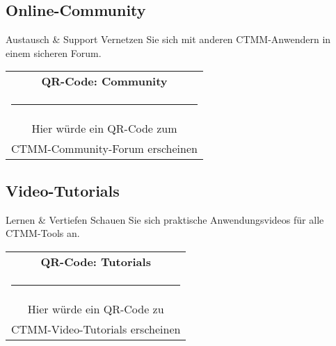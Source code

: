 \subsection*{\textcolor{ctmmPurple}{Online-Community}}

\begin{ctmmGreenBox}{Austausch \& Support}
Vernetzen Sie sich mit anderen CTMM-Anwendern in einem sicheren Forum.

\begin{center}
\begin{tabular}{c}
\textbf{QR-Code: Community}\\
\rule{3cm}{3cm}\\
\small{Hier würde ein QR-Code zum}\\
\small{CTMM-Community-Forum erscheinen}
\end{tabular}
\end{center}
\end{ctmmGreenBox}

\subsection*{\textcolor{ctmmPurple}{Video-Tutorials}}

\begin{ctmmOrangeBox}{Lernen \& Vertiefen}
Schauen Sie sich praktische Anwendungsvideos für alle CTMM-Tools an.

\begin{center}
\begin{tabular}{c}
\textbf{QR-Code: Tutorials}\\
\rule{3cm}{3cm}\\
\small{Hier würde ein QR-Code zu}\\
\small{CTMM-Video-Tutorials erscheinen}
\end{tabular}
\end{center}
\end{ctmmOrangeBox}
